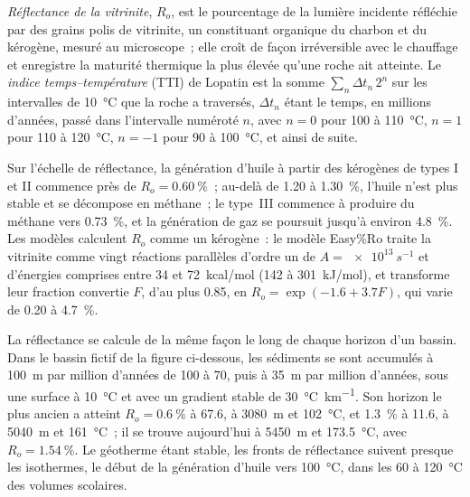 \begin{definition}\label{def:b2:energy-geology:maturity}
\emph{Réflectance de la vitrinite}, $R_o$, est le pourcentage de la lumière incidente
réfléchie par des grains polis de vitrinite, un constituant organique du charbon et du kérogène,
mesuré au microscope~; elle croît de façon irréversible avec le chauffage et enregistre la maturité thermique la plus élevée qu'une roche ait atteinte. Le
\emph{indice temps--température} (TTI) de Lopatin est la somme
$\sum_n \Delta t_n\,2^n$ sur les intervalles de \qty{10}{\celsius} que la roche a traversés,
$\Delta t_n$ étant le temps, en millions d'années, passé dans l'intervalle numéroté $n$, avec $n = 0$
pour 100 à \qty{110}{\celsius}, $n = 1$ pour 110 à \qty{120}{\celsius}, $n = -1$ pour 90 à
\qty{100}{\celsius}, et ainsi de suite.
\end{definition}

Sur l'échelle de réflectance, la génération d'huile à partir des kérogènes de types I et II commence près de $R_o =
\qty{0.60}{\percent}$~; au-delà de 1.20 à \qty{1.30}{\percent}, l'huile n'est plus stable et se décompose en
méthane~; le type~III commence à produire du méthane vers \qty{0.73}{\percent}, et la génération de gaz se poursuit jusqu'à
environ \qty{4.8}{\percent}. Les modèles calculent $R_o$ comme un kérogène~: le modèle Easy\%Ro
traite la vitrinite comme vingt réactions parallèles d'ordre un de $A = \qty{e13}{s^{-1}}$ et d'énergies
comprises entre 34 et \qty{72}{kcal/mol} (142 à \qty{301}{kJ/mol}), et transforme leur fraction convertie $F$,
d'au plus 0.85, en $R_o = \exp(-1.6 + 3.7F)$, qui varie de 0.20 à \qty{4.7}{\percent}.

La réflectance se calcule de la même façon le long de chaque horizon d'un bassin. Dans le bassin fictif de la figure
ci-dessous, les sédiments se sont accumulés à \qty{100}{m} par million d'années de 100 à \qty{70}{\Ma},
puis à \qty{35}{m} par million d'années, sous une surface à \qty{10}{\celsius} et avec un gradient stable de
\qty{30}{\celsius\per\km}. Son horizon le plus ancien a atteint $R_o = \qty{0.6}{\percent}$ à
\qty{67.6}{\Ma}, à \qty{3080}{m} et \qty{102}{\celsius}, et \qty{1.3}{\percent} à
\qty{11.6}{\Ma}, à \qty{5040}{m} et \qty{161}{\celsius}~; il se trouve aujourd'hui à \qty{5450}{m} et
\qty{173.5}{\celsius}, avec $R_o = \qty{1.54}{\percent}$. Le géotherme étant stable, les
fronts de réflectance suivent presque les isothermes, le début de la génération d'huile vers
\qty{100}{\celsius}, dans les 60 à \qty{120}{\celsius} des volumes scolaires.

